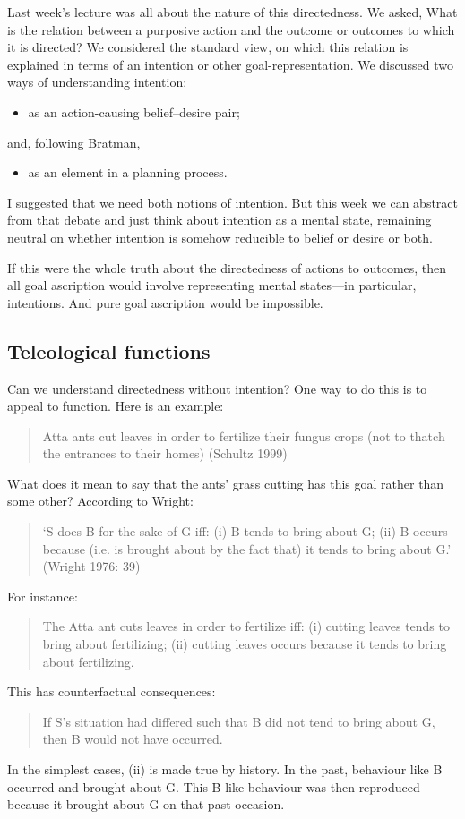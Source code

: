 \documentclass[12pt,\papersize]{extarticle}
\begin{document}
Last week's lecture was all about the nature of this directedness. 
We asked, What is the relation between a purposive action and the outcome or outcomes to which it is directed?
We considered the standard view, on which this relation is explained in terms of an intention or other goal-representation.
We discussed two ways of understanding intention:
\begin{itemize}
\item as an action-causing belief--desire pair;
\end{itemize}
and, following Bratman,
\begin{itemize}
\item as an element in a planning process.
\end{itemize}
I suggested that we need both notions of intention.
But this week we can abstract from that debate and just think about intention as a mental state, remaining neutral on whether intention is somehow reducible to belief or desire or both.

If this were the whole truth about the directedness of actions to outcomes, then all goal ascription would involve representing mental states---in particular, intentions.
And pure goal ascription would be impossible.

\subsection{Teleological functions}
Can we understand directedness without intention?
One way to do this is to appeal to function.
Here is an example:
%
\begin{quote}
Atta ants cut leaves in order to fertilize their fungus crops (not to thatch the entrances to their homes) (Schultz 1999)
\end{quote}
%
What does it mean to say that the ants’ grass cutting has this goal rather than some other? According to Wright:
\begin{quote}
`S does B for the sake of G iff: (i) B tends to bring about G; (ii) B occurs because (i.e. is brought about by the fact that) it tends to bring about G.' (Wright 1976: 39)
\end{quote}
%
For instance:
%
\begin{quote}
The Atta ant cuts leaves in order to fertilize iff: (i) cutting leaves tends to bring about fertilizing; (ii) cutting leaves occurs because it tends to bring about fertilizing.
\end{quote}
%
This has counterfactual consequences:
\begin{quote}
If S’s situation had differed such that B did not tend to bring about G, then B would not have occurred.
\end{quote}
%
In the simplest cases, (ii) is made true by history. In the past, behaviour like B occurred and brought about G. This B-like behaviour was then reproduced because it brought about G on that past occasion.
\end{document}
